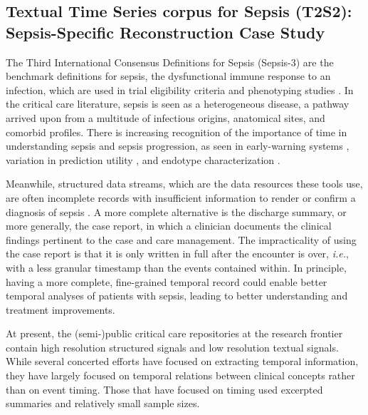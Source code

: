 \subsection{Textual Time Series corpus for Sepsis (T2S2): Sepsis-Specific Reconstruction Case Study}
\label{ch06:sec:intro}

The Third International Consensus Definitions for Sepsis (Sepsis-3) are the benchmark definitions for sepsis, the dysfunctional immune response to an infection, which are used in trial eligibility criteria \citep{kyriazopoulou2021procalcitonin} and phenotyping studies \citep{ch06:seymour2019derivation}.
In the critical care literature, sepsis is seen as a heterogeneous disease, a pathway arrived upon from a multitude of infectious origins, anatomical sites, and comorbid profiles.  
There is increasing recognition of the importance of time in understanding sepsis and sepsis progression, as seen in early-warning systems \citep{henry2022factors}, variation in prediction utility \citep{kamran2024evaluation}, and endotype characterization \citep{ch06:noroozizadeh2023temporal}.

Meanwhile, structured data streams, which are the data resources these tools use, are often incomplete records with insufficient information to render or confirm a diagnosis of sepsis \citep{moldwin2021empirical}. %
A more complete alternative is the discharge summary, or more generally, the case report, in which a clinician documents the clinical findings pertinent to the case and care management.
The impracticality of using the case report is that it is only written in full after the encounter is over, \emph{i.e.}, with a less granular timestamp than the events contained within. 
In principle, having a more complete, fine-grained temporal record could enable better temporal analyses of patients with sepsis, leading to better understanding and treatment improvements.

At present, the (semi-)public critical care repositories at the research frontier contain high resolution structured signals and low resolution textual signals. 
While several concerted efforts have focused on extracting temporal information, they have largely focused on temporal relations between clinical concepts \citep{sun2013evaluating} rather than on event timing.  
Those that have focused on timing \citep{leeuwenberg2020towards,ch06:frattallone2024using} used excerpted summaries and relatively small sample sizes. 


